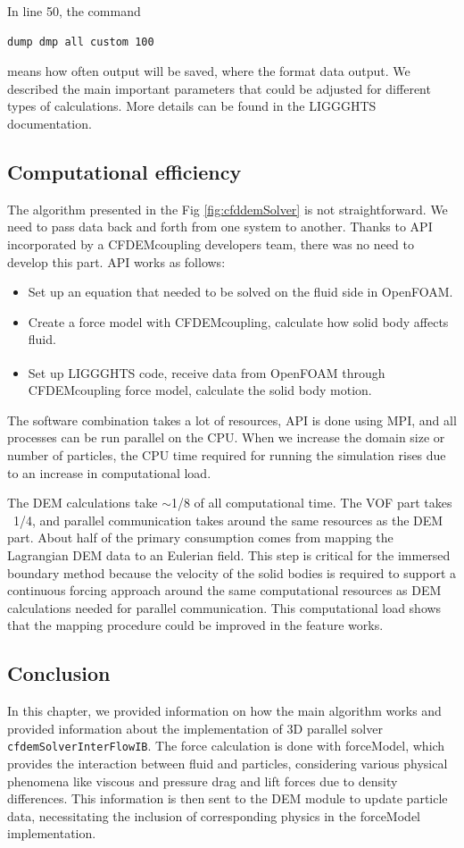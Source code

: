 In line 50, the command 
\begin{verbatim}
dump dmp all custom 100
\end{verbatim}
means how often output will be saved, where the format data output.
We described the main important parameters that could be adjusted for different types of calculations. More details can be found in the LIGGGHTS documentation.


\subsection{Computational efficiency}
The algorithm presented in the Fig \ref{fig:cfddemSolver} is not straightforward. We need to pass data back and forth from one system to another. Thanks to API incorporated by a CFDEMcoupling developers team, there was no need to develop this part. API works as follows: 
\begin{itemize}
    \item Set up an equation that needed to be solved on the fluid side in OpenFOAM.
    \item Create a force model with CFDEMcoupling, calculate how solid body affects fluid.
    \item Set up LIGGGHTS\textsuperscript{\textregistered} code, receive data from OpenFOAM\textsuperscript{\textregistered} through CFDEMcoupling force model, calculate the solid body motion.
\end{itemize}

The software combination takes a lot of resources, API is done using MPI, and all processes can be run parallel on the CPU. When we increase the domain size or number of particles, the CPU time required for running the simulation rises due to an increase in computational load.

The DEM calculations take $\sim$1/8 of all computational time. The VOF part takes ~1/4, and parallel communication takes around the same resources as the DEM part. About half of the primary consumption comes from mapping the Lagrangian DEM data to an Eulerian field. This step is critical for the immersed boundary method because the velocity of the solid bodies is required to support a continuous forcing approach around the same computational resources as DEM calculations needed for parallel communication. This computational load shows that the mapping procedure could be improved in the feature works.

\subsection{Conclusion}
In this chapter, we provided information on how the main algorithm works and provided information about the implementation of 3D parallel solver \verb|cfdemSolverInterFlowIB|. The force calculation is done with forceModel, which provides the interaction between fluid and particles, considering various physical phenomena like viscous and pressure drag and lift forces due to density differences. This information is then sent to the DEM module to update particle data, necessitating the inclusion of corresponding physics in the forceModel implementation.

